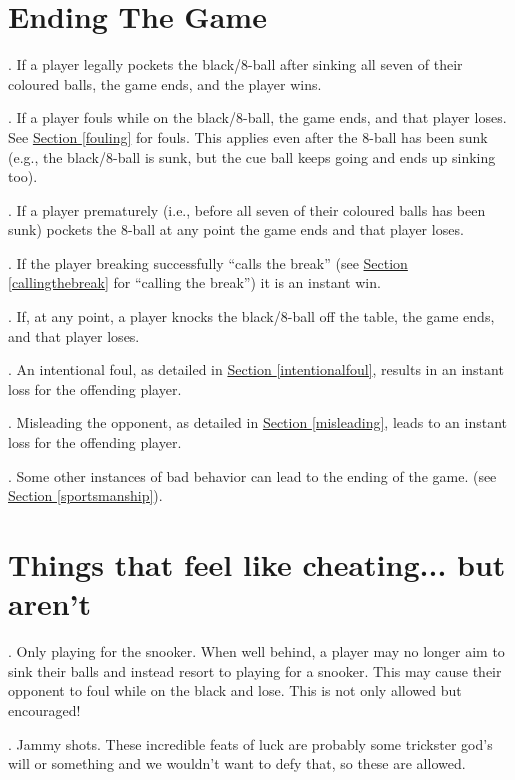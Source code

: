 \documentclass[a4paper, twocolumn]{article}
\begin{document}
\section{Ending The Game} \label{ending}
\ex. If a player legally pockets the black/8-ball after sinking all seven of their coloured balls, the game ends, and the player wins.\par
\ex. If a player fouls while on the black/8-ball, the game ends, and that player loses. See \hyperref[fouling]{Section \ref*{fouling}} for fouls. This applies even after the 8-ball has been sunk (e.g., the black/8-ball is sunk, but the cue ball keeps going and ends up sinking too).\par
\ex. If a player prematurely (i.e., before all seven of their coloured balls has been sunk) pockets the 8-ball at any point the game ends and that player loses.\par
\ex. If the player breaking successfully “calls the break” (see \hyperref[callingthebreak]{Section \ref*{callingthebreak}} for “calling the break”) it is an instant win.\par
\ex. If, at any point, a player knocks the black/8-ball off the table, the game ends, and that player loses.\par
\ex. An intentional foul, as detailed in \hyperref[intentionalfoul]{Section \ref*{intentionalfoul}}, results in an instant loss for the offending player.\par
\ex. Misleading the opponent, as detailed in \hyperref[misleading]{Section \ref*{misleading}}, leads to an instant loss for the offending player.\par
\ex. Some other instances of bad behavior can lead to the ending of the game. (see \hyperref[sportsmanship]{Section \ref*{sportsmanship}}).\par

\section{Things that feel like cheating... but aren't} \label{notcheating}
\ex. Only playing for the snooker. When well behind, a player may no longer aim to sink their balls and instead resort to playing for a snooker. This may cause their opponent to foul while on the black and lose. This is not only allowed but encouraged!\par
\ex. Jammy shots. These incredible feats of luck are probably some trickster god's will or something and we wouldn't want to defy that, so these are allowed.\par
\end{document}
